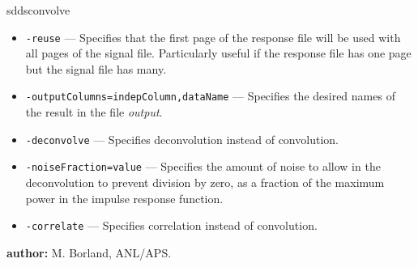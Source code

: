 \begin{sddsprog}{sddsconvolve}
\begin{itemize}
      \item \verb|-reuse| --- Specifies that the first page of the response file will be used with all pages of the signal file. Particularly useful if the response file has one page but the signal file has many.
      \item \verb|-outputColumns=indepColumn,dataName| --- Specifies the desired names of the result in the file \emph{output}.
      \item \verb|-deconvolve| --- Specifies deconvolution instead of convolution.
      \item \verb|-noiseFraction=value| --- Specifies the amount of noise to allow in the deconvolution to prevent division by zero, as a fraction of the maximum power in the impulse response function.
      \item \verb|-correlate| --- Specifies correlation instead of convolution.
    \end{itemize}
  \item \textbf{author:} M. Borland, ANL/APS.
\end{sddsprog}

